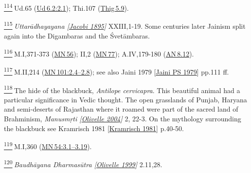 \label{footprints_split_024.html_fn114}
\hyperref[footprints_split_007.htmlux5cux23fnref114]{\textsuperscript{114}} Ud.65
(\href{https://suttacentral.net/ud6.2/en/sujato\#2.1}{Ud\,6.2:2.1});
Thi.107 (\href{https://suttacentral.net/thig5.9/en/sujato}{Thig\,5.9}).

\label{footprints_split_024.html_fn115}
\hyperref[footprints_split_007.htmlux5cux23fnref115]{\textsuperscript{115}} \emph{{Uttarādhayayana
{{[}\hyperref[footprints_split_022.htmlux5cux23Jacobiux5cux25201895]{Jacobi
1895}{]}}}} XXIII,1-19. Some centuries later Jainism split again into
the Digambaras and the Śvetāmbaras.

\label{footprints_split_024.html_fn116}
\hyperref[footprints_split_007.htmlux5cux23fnref116]{\textsuperscript{116}} M.I,371-373
(\href{https://suttacentral.net/mn56/en/sujato}{MN\,56}); II,2
(\href{https://suttacentral.net/mn77/en/sujato}{MN\,77}); A.IV,179-180
(\href{https://suttacentral.net/an8.12/en/sujato}{AN\,8.12}).

\label{footprints_split_024.html_fn117}
\hyperref[footprints_split_007.htmlux5cux23fnref117]{\textsuperscript{117}} M.II,214
(\href{https://suttacentral.net/mn101/en/sujato\#2.4}{MN\,101:2.4--2.8});
see also {Jaini 1979
{{[}\hyperref[footprints_split_022.htmlux5cux23Jainiux5cux2520PSux5cux25201979]{Jaini
PS 1979}{]}}} pp.111 ff.

\label{footprints_split_024.html_fn118}
\hyperref[footprints_split_007.htmlux5cux23fnref118]{\textsuperscript{118}} The
hide of the blackbuck, \emph{Antilope cervicapra}. This beautiful animal
had a particular significance in Vedic thought. The open grasslands of
Punjab, Haryana and semi-deserts of Rajasthan where it roamed were part
of the sacred land of Brahminism, \emph{{Manusmṛti
{{[}\hyperref[footprints_split_022.htmlux5cux23Olivelleux5cux25202004]{Olivelle
2004}{]}}}} 2, 22-3. On the mythology surrounding the blackbuck see
{Kramrisch 1981
{{[}\hyperref[footprints_split_023.htmlux5cux23Kramrischux5cux25201981]{Kramrisch
1981}{]}}} p.40-50.

\label{footprints_split_024.html_fn119}
\hyperref[footprints_split_007.htmlux5cux23fnref119]{\textsuperscript{119}} M.I,360
(\href{https://suttacentral.net/mn54/en/sujato\#3.1}{MN\,54:3.1--3.19}).

\label{footprints_split_024.html_fn120}
\hyperref[footprints_split_007.htmlux5cux23fnref120]{\textsuperscript{120}} \emph{{Baudhāyana
Dharmasūtra
{{[}\hyperref[footprints_split_022.htmlux5cux23Olivelleux5cux25201999]{Olivelle
1999}{]}}}} 2.11,28.

